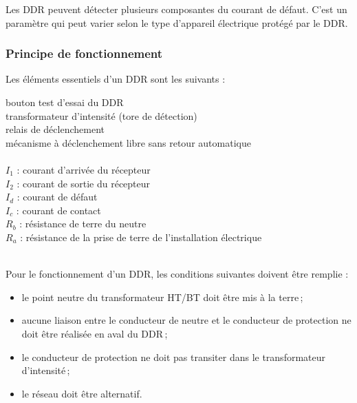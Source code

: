 Les DDR peuvent détecter plusieurs composantes du courant de défaut. C'est un paramètre qui peut varier selon le type d'appareil électrique protégé par le DDR.



\subsubsection{Principe de fonctionnement}

Les éléments essentiels d'un DDR sont les suivants : \\
\begin{minipage}{\linewidth} %
	\begin{multicols}{2} %
	\startcstep %
		 bouton test d'essai du DDR\\ %
		 transformateur d'intensité (tore de détection)\\
		 relais de déclenchement  \\
		 mécanisme à déclenchement libre sans retour automatique \\
		\columnbreak\\ %
		$I_1$ : courant \og d'arrivée \fg{} du récepteur \\
		$I_2$ : courant \og de sortie \fg{} du récepteur \\
		$I_d$ : courant de défaut\\
		$I_c$ : courant de contact\\
		$R_b$ : résistance de terre du neutre\\
		$R_a$ : résistance de la prise de terre de l'installation électrique 
	\end{multicols}
\end{minipage}
~\\
Pour le fonctionnement d'un DDR, les conditions suivantes doivent être remplie :
\begin{itemize}
\item le point neutre du transformateur HT/BT doit être mis à la terre\,;
\item aucune liaison entre le conducteur de neutre et le conducteur de protection ne doit être réalisée en aval du DDR\,;
\item le conducteur de protection ne doit pas transiter dans le transformateur d'intensité\,;
\item le réseau doit être alternatif.
\end{itemize}

